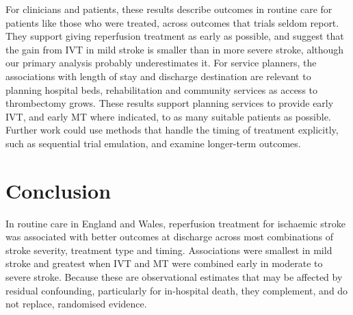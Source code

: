 For clinicians and patients, these results describe outcomes in routine care for patients like those who were treated, across outcomes that trials seldom report. They support giving reperfusion treatment as early as possible, and suggest that the gain from IVT in mild stroke is smaller than in more severe stroke, although our primary analysis probably underestimates it. For service planners, the associations with length of stay and discharge destination are relevant to planning hospital beds, rehabilitation and community services as access to thrombectomy grows. These results support planning services to provide early IVT, and early MT where indicated, to as many suitable patients as possible. Further work could use methods that handle the timing of treatment explicitly, such as sequential trial emulation, and examine longer-term outcomes.

\section{Conclusion}

In routine care in England and Wales, reperfusion treatment for ischaemic stroke was associated with better outcomes at discharge across most combinations of stroke severity, treatment type and timing. Associations were smallest in mild stroke and greatest when IVT and MT were combined early in moderate to severe stroke. Because these are observational estimates that may be affected by residual confounding, particularly for in-hospital death, they complement, and do not replace, randomised evidence.
